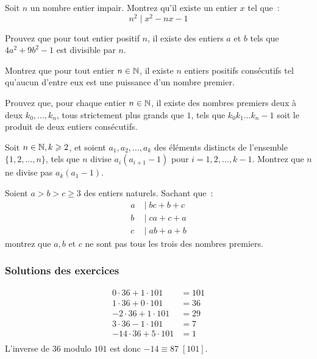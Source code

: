 \begin{exo}
Soit $n$ un nombre entier impair.
Montrez qu'il existe un entier $x$ tel que~:
$$n^2 \;|\; x^2 - nx - 1$$
\end{exo}

\begin{exo}
Prouvez que pour tout entier positif $n$, il existe des entiers $a$ et $b$ tels que $4a^2 + 9b^2 - 1$ est divisible par $n$.
\end{exo}

\begin{exo}[IMO 1989]
Montrez que pour tout entier $n \in \mathbb N$, il existe $n$ entiers positifs consécutifs tel qu'aucun d'entre eux est une puissance d'un nombre premier.
\end{exo}

\begin{exo}
Prouvez que, pour chaque entier $n \in \mathbb N$, il existe des nombres premiers deux à deux $k_0, \dots, k_n$, tous strictement plus grands que $1$, tels que $k_0k_1 \dots k_n - 1$ soit le produit de deux entiers consécutifs.
\end{exo}

\begin{exo}[P1 IMO 2009]
Soit $n \in \mathbb N, k \geqslant 2$, et soient $a_1, a_2, \dots, a_k$ des éléments distincts de l'ensemble $\{1, 2, \dots, n\}$, tels que $n$ divise $a_i(a_{i + 1} - 1)$ pour $i = 1, 2, \dots, k - 1$. Montrez que $n$ ne divise pas $a_k(a_1 - 1)$.
\end{exo}

\begin{exo}
Soient $a > b > c \ge 3$ des entiers naturels. Sachant que~:
\begin{align*}
a & \;|\; bc + b + c \\
b & \;|\; ca + c + a \\
c & \;|\; ab + a + b
\end{align*}
montrez que $a, b$ et $c$ ne sont pas tous les trois des nombres premiers.
\end{exo}

\subsubsection{Solutions des exercices}

\begin{sol}
\begin{align*}
0 \cdot 36 + 1 \cdot 101 &= 101 \\
1 \cdot 36 + 0 \cdot 101 &= 36 \\
-2 \cdot 36 + 1 \cdot 101 &= 29 \\
3 \cdot 36 - 1 \cdot 101 &= 7 \\
-14 \cdot 36 + 5 \cdot 101 &= 1 \\
\end{align*}
L'inverse de $36$ modulo $101$ est donc $-14 \equiv 87 \; [101]$.
\end{sol}

